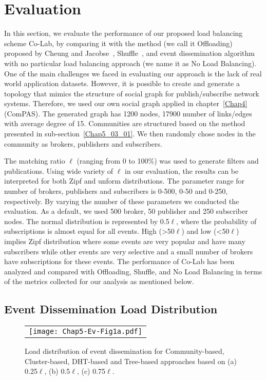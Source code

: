 \section{Evaluation}\label{Chap5_05}
In this section, we evaluate the performance of our proposed load balancing scheme Co-Lab, by comparing it with the method (we call it Offloading) proposed by Cheung and Jacobse~\cite{AKYCheung2010}, Shuffle~\cite{HZhang2008}, and event dissemination algorithm with no particular load balancing approach (we name it as No Load Balancing). One of the main challenges we faced in evaluating our approach is the lack of real world application datasets. However, it is possible to create and generate a topology that mimics the structure of social graph for publish/subscribe network systems. Therefore, we used our own social graph applied in chapter~\ref{Chap4} (ComPAS). The generated graph has 1200 nodes, 17900 number of links/edges with average degree of 15. Communities are structured based on the method presented in sub-section~\ref{Chap5_03_01}. We then randomly chose nodes in the community as brokers, publishers and subscribers.

The matching ratio $\ell$ (ranging from 0 to 100\%) was used to generate filters and publications. Using wide variety of $\ell$ in our evaluation, the results can be interpreted for both Zipf and unform distributions. The parameter range for number of brokers, publishers and subscribers is 0-500, 0-50 and 0-250, respectively. By varying the number of these parameters we conducted the evaluation. As a default, we used 500 broker, 50 publisher and 250 subscriber nodes. The normal distribution is represented by 0.5$\ell$, where the probability of subscriptions is almost equal for all events. High (>50$\ell$) and low (<50$\ell$) implies Zipf distribution where some events are very popular and have many subscribers while other events are very selective and a small number of brokers have subscriptions for these events. The performance of Co-Lab has been analyzed and compared with Offloading, Shuffle, and No Load Balancing in terms of the metrics collected for our analysis as mentioned below.

\subsection{Event Dissemination Load Distribution}\label{Chap5_05_01}
\begin{figure}[t]
\begin{center}
  \begin{tabular}{c}
  \texttt{[image: Chap5-Ev-Fig1a.pdf]}
  \end{tabular}
  \caption{Load distribution of event dissemination for Community-based, Cluster-based, DHT-based and Tree-based approaches based on (a) 0.25$\ell$, (b) 0.5$\ell$, (c) 0.75$\ell$.}
\end{center}
\end{figure}


